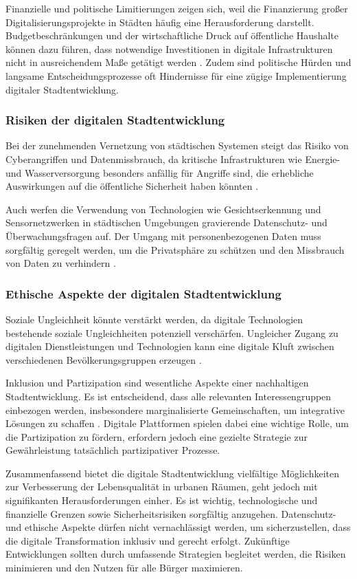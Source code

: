 \documentclass[conference,compsoc,final,a4paper, onecolumn, 11pt]{IEEEtran}
\begin{document}
Finanzielle und politische Limitierungen zeigen sich, weil die Finanzierung großer Digitalisierungsprojekte in Städten häufig eine Herausforderung darstellt. 
Budgetbeschränkungen und der wirtschaftliche Druck auf öffentliche Haushalte können dazu führen, dass notwendige Investitionen in digitale Infrastrukturen nicht in ausreichendem Maße getätigt werden \autocite{WorldBank2018}. 
Zudem sind politische Hürden und langsame Entscheidungsprozesse oft Hindernisse für eine zügige Implementierung digitaler Stadtentwicklung.

\subsubsection{Risiken der digitalen Stadtentwicklung}
Bei der zunehmenden Vernetzung von städtischen Systemen steigt das Risiko von Cyberangriffen und Datenmissbrauch, da kritische Infrastrukturen wie Energie- und Wasserversorgung besonders anfällig für Angriffe sind, die erhebliche Auswirkungen auf die öffentliche Sicherheit haben könnten \autocite{ENISA2019}.

Auch werfen die Verwendung von Technologien wie Gesichtserkennung und Sensornetzwerken in städtischen Umgebungen gravierende Datenschutz- und Überwachungsfragen auf. 
Der Umgang mit personenbezogenen Daten muss sorgfältig geregelt werden, um die Privatsphäre zu schützen und den Missbrauch von Daten zu verhindern \autocite{Zuboff2019}.

\subsubsection{Ethische Aspekte der digitalen Stadtentwicklung}
Soziale Ungleichheit könnte verstärkt werden, da digitale Technologien bestehende soziale Ungleichheiten potenziell verschärfen. 
Ungleicher Zugang zu digitalen Dienstleistungen und Technologien kann eine digitale Kluft zwischen verschiedenen Bevölkerungsgruppen erzeugen \autocite{Helsper2012}.

Inklusion und Partizipation sind wesentliche Aspekte einer nachhaltigen Stadtentwicklung. 
Es ist entscheidend, dass alle relevanten Interessengruppen einbezogen werden, insbesondere marginalisierte Gemeinschaften, um integrative Lösungen zu schaffen \autocite{Arnstein1969}. 
Digitale Plattformen spielen dabei eine wichtige Rolle, um die Partizipation zu fördern, erfordern jedoch eine gezielte Strategie zur Gewährleistung tatsächlich partizipativer Prozesse.

Zusammenfassend bietet die digitale Stadtentwicklung vielfältige Möglichkeiten zur Verbesserung der Lebensqualität in urbanen Räumen, geht jedoch mit signifikanten Herausforderungen einher. 
Es ist wichtig, technologische und finanzielle Grenzen sowie Sicherheitsrisiken sorgfältig anzugehen. 
Datenschutz- und ethische Aspekte dürfen nicht vernachlässigt werden, um sicherzustellen, dass die digitale Transformation inklusiv und gerecht erfolgt. 
Zukünftige Entwicklungen sollten durch umfassende Strategien begleitet werden, die Risiken minimieren und den Nutzen für alle Bürger maximieren.
\end{document}
